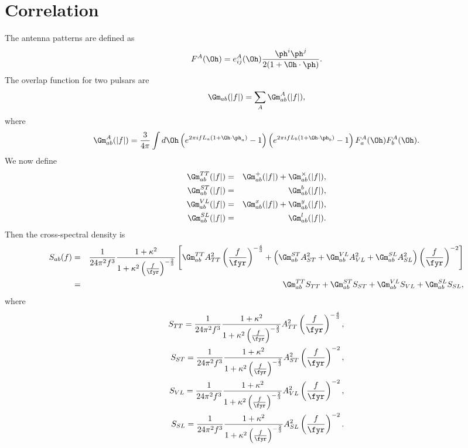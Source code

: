 \documentclass[
reprint,           %
superscriptaddress,%
amsmath,           %
amssymb,           %
aps,               %
prl,               %
notitlepage,       %
floatfix,          %
nofootinbib,
onecolumn
]{revtex4-1}
\def\({\left(}
\def\){\right)}
\def\[{\left[}
\def\]{\right]}
\def\e{\begin{equation}}
\def\q{\end{equation}}
\def\m{\begin{eqnarray}}
\def\n{\end{eqnarray}}
\begin{document}
\section{Correlation}
The antenna patterns are defined as
\e 
    F^A(\Oh) = e^A_{ij}(\Oh) \frac{\ph^i\ph^j}{2(1+\Oh\cdot\ph)}.
\q 
The overlap function for two pulsars are 
\e 
    \Gm_{ab}(|f|) = \sum_A \Gm^A_{ab}(|f|),
\q 
where 
\e 
    \Gm^A_{ab}(|f|) = \frac{3}{4\pi} \int d\Oh \(e^{2\pi i f L_a(1+\Oh\cdot\ph_a)}-1\)
        \(e^{2\pi i f L_b(1+\Oh\cdot\ph_b)}-1\) F^A_a(\Oh) F^A_b(\Oh).
\q 
We now define
\m 
    \Gm^{TT}_{ab}(|f|) &=& \Gm^{+}_{ab}(|f|) + \Gm^{\times}_{ab}(|f|),\\
    \Gm^{ST}_{ab}(|f|) &=& \Gm^{b}_{ab}(|f|),\\
    \Gm^{VL}_{ab}(|f|) &=& \Gm^{x}_{ab}(|f|) + \Gm^{y}_{ab}(|f|),\\
    \Gm^{SL}_{ab}(|f|) &=& \Gm^{l}_{ab}(|f|).
\n 
Then the cross-spectral density is 
\m 
    S_{ab}(f) &=& \frac{1}{24\pi^2f^3} \frac{1+\kappa^2}{1+\kappa^2\(\frac{f}{\fyr}\)^{-\frac{2}{3}}}
        \[\Gm^{TT}_{ab} A_{TT}^2 \(\frac{f}{\fyr}\)^{-\frac{4}{3}}
        +\(\Gm^{ST}_{ab} A_{ST}^2 + \Gm^{VL}_{ab} A_{VL}^2 
            + \Gm^{SL}_{ab} A_{SL}^2\)\(\frac{f}{\fyr}\)^{-2}\]\\
        &=& \Gm^{TT}_{ab} S_{TT} + \Gm^{ST}_{ab}S_{ST} + \Gm^{VL}_{ab} S_{VL} 
        + \Gm^{SL}_{ab} S_{SL},
\n 
where
\m 
    S_{TT} = \frac{1}{24\pi^2f^3} \frac{1+\kappa^2}{1+\kappa^2\(\frac{f}{\fyr}\)^{-\frac{2}{3}}} A_{TT}^2 \(\frac{f}{\fyr}\)^{-\frac{4}{3}}, \\
    S_{ST} = \frac{1}{24\pi^2f^3} \frac{1+\kappa^2}{1+\kappa^2\(\frac{f}{\fyr}\)^{-\frac{2}{3}}} A_{ST}^2 \(\frac{f}{\fyr}\)^{-2}, \\
    S_{VL} = \frac{1}{24\pi^2f^3} \frac{1+\kappa^2}{1+\kappa^2\(\frac{f}{\fyr}\)^{-\frac{2}{3}}} A_{VL}^2 \(\frac{f}{\fyr}\)^{-2}, \\
    S_{SL} = \frac{1}{24\pi^2f^3} \frac{1+\kappa^2}{1+\kappa^2\(\frac{f}{\fyr}\)^{-\frac{2}{3}}} A_{SL}^2 \(\frac{f}{\fyr}\)^{-2}.
\n 
%
%
	
\end{document}
